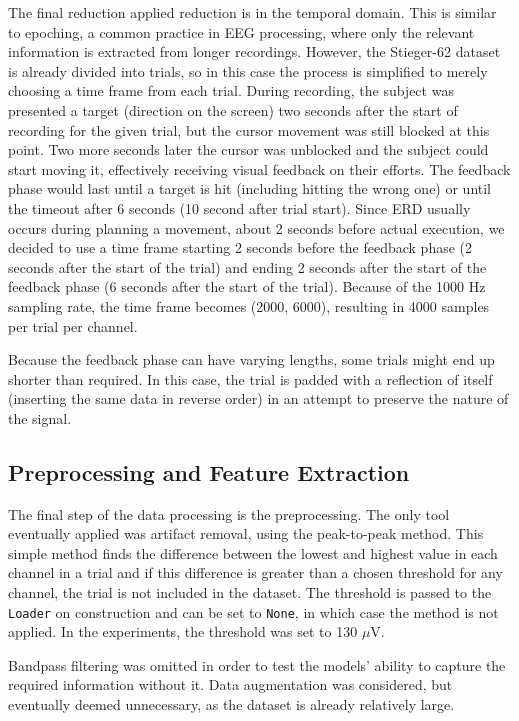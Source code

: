 \documentclass[english, he, bc, kiv, iso690alph, viewonly]{fasthesis}
\begin{document}
The final reduction applied reduction is in the temporal domain. This is similar to epoching, a common practice in EEG processing, where only the relevant information is extracted from longer recordings. However, the Stieger-62 dataset is already divided into trials, so in this case the process is simplified to merely choosing a time frame from each trial. During recording, the subject was presented a target (direction on the screen) two seconds after the start of recording for the given trial, but the cursor movement was still blocked at this point. Two more seconds later the cursor was unblocked and the subject could start moving it, effectively receiving visual feedback on their efforts. The feedback phase would last until a target is hit (including hitting the wrong one) or until the timeout after 6 seconds (10 second after trial start). Since ERD usually occurs during planning a movement, about 2 seconds before actual execution, we decided to use a time frame starting 2 seconds before the feedback phase (2 seconds after the start of the trial) and ending 2 seconds after the start of the feedback phase (6 seconds after the start of the trial). Because of the 1000 Hz sampling rate, the time frame becomes (2000, 6000), resulting in 4000 samples per trial per channel.


Because the feedback phase can have varying lengths, some trials might end up shorter than required. In this case, the trial is padded with a reflection of itself (inserting the same data in reverse order) in an attempt to preserve the nature of the signal.

\subsection{Preprocessing and Feature Extraction}

The final step of the data processing is the preprocessing. The only tool eventually applied was artifact removal, using the peak-to-peak method. This simple method finds the difference between the lowest and highest value in each channel in a trial and if this difference is greater than a chosen threshold for any channel, the trial is not included in the dataset. The threshold is passed to the \texttt{Loader} on construction and can be set to \texttt{None}, in which case the method is not applied. In the experiments, the threshold was set to 130 $\mu$V.

Bandpass filtering was omitted in order to test the models' ability to capture the required information without it. Data augmentation was considered, but eventually deemed unnecessary, as the dataset is already relatively large.
\end{document}
